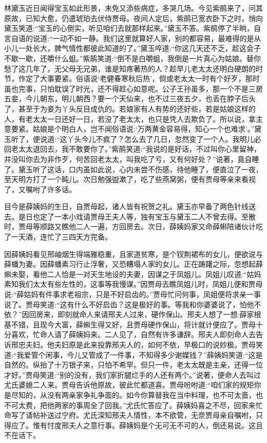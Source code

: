 \begin{parag}
    林黛玉近日闻得宝玉如此形景，未免又添些病症，多哭几场。今见紫鹃来了，问其原故，已知大愈，仍遣琥珀去伏侍贾母。夜间人定后，紫鹃已宽衣卧下之时，悄向黛玉笑道:“宝玉的心倒实，听见咱们去就那样起来。”黛玉不答。紫鹃停了半晌，自言自语的说道:“一动不如一静。我们这里就算好人家，别的都容易，最难得的是从小儿一处长大，脾气情性都彼此知道的了。”黛玉啐道:“你这几天还不乏，趁这会子不歇一歇，还嚼什么蛆。”紫鹃笑道:“倒不是白嚼蛆，我倒是一片真心为姑娘。替你愁了这几年了，无父母无兄弟，谁是知疼著热的人？趁早儿老太太还明白硬朗的时节，作定了大事要紧。俗语说‘老健春寒秋后热’，倘或老太太一时有个好歹，那时虽也完事，只怕耽误了时光，还不得趁心如意呢。公子王孙虽多，那一个不是三房五妾，今儿朝东，明儿朝西？要一个天仙来，也不过三夜五夕，也丢在脖子后头了，甚至于为妾为丫头反目成仇的。若娘家有人有势的还好些，若是姑娘这样的人，有老太太一日还好一日，若没了老太太，也只是凭人去欺负了。所以说，拿主意要紧。姑娘是个明白人，岂不闻俗语说:‘万两黄金容易得，知心一个也难求’。”黛玉听了，便说道:“这丫头今儿不疯了？怎么去了几日，忽然变了一个人。我明儿必回老太太退回去，我不敢要你了。”紫鹃笑道:“我说的是好话，不过叫你心里留神，并没叫你去为非作歹，何苦回老太太，叫我吃了亏，又有何好处？”说著，竟自睡了。黛玉听了这话，口内虽如此说，心内未尝不伤感，待他睡了，便直泣了一夜，至天明方打了一个盹儿。次日勉强盥漱了，吃了些燕窝粥，便有贾母等亲来看视了，又嘱咐了许多话。
\end{parag}


\begin{parag}
    目今是薛姨妈的生日，自贾母起，诸人皆有祝贺之礼。黛玉亦早备了两色针线送去。是日也定了一本小戏请贾母王夫人等，独有宝玉与黛玉二人不曾去得。至散时，贾母等顺路又瞧他二人一遍，方回房去。次日，薛姨妈家又命薛蝌陪诸伙计吃了一天酒，连忙了三四天方完备。
\end{parag}


\begin{parag}
    因薛姨妈看见邢岫烟生得端雅稳重，且家道贫寒，是个钗荆裙布的女儿，便欲说与薛蟠为妻。因薛蟠素习行止浮奢，又恐糟塌人家的女儿。正在踌躇之际，忽想起薛蝌未娶，看他二人恰是一对天生地设的夫妻，因谋之于凤姐儿。凤姐儿叹道:“姑妈素知我们太太有些左性的，这事等我慢谋。”因贾母去瞧凤姐儿时，凤姐儿便和贾母说:“薛姑妈有件事求老祖宗，只是不好启齿的。”贾母忙问何事，凤姐便将求亲一事说了。贾母笑道:“这有什么不好启齿？这是极好的事。等我和你婆婆说了，怕他不依？”因回房来，即刻就命人来请邢夫人过来，硬作保山。邢夫人想了一想:薛家根基不错，且现今大富，薛蝌生得又好，且贾母硬作保山，将计就计便应了。贾母十分喜欢，忙命人请了薛姨妈来。二人见了，自然有许多谦辞。邢夫人即刻命人去告诉邢忠夫妇。他夫妇原是此来投靠邢夫人的，如何不依，早极口的说妙极。贾母笑道:“我爱管个闲事，今儿又管成了一件事，不知得多少谢媒钱？”薛姨妈笑道:“这是自然的。纵抬了十万银子来，只怕不希罕。但只一件，老太太既是主亲，还得一位才好。”贾母笑道:“别的没有，我们家折腿烂手的人还有两个。”说著，便命人去叫过尤氏婆媳二人来。贾母告诉他原故，彼此忙都道喜。贾母吩咐道:“咱们家的规矩你是尽知的，从没有两亲家争礼争面的。如今你算替我在当中料理，也不可太啬，也不可太费，把他两家的事周全了回我。”尤氏忙答应了。薛姨妈喜之不尽，回家来忙命写了请帖补送过宁府。尤氏深知邢夫人情性，本不欲管，无奈贾母亲自嘱咐，只得应了。惟有忖度邢夫人之意行事。薛姨妈是个无可无不可的人，倒还易说。这且不在话下。
\end{parag}


